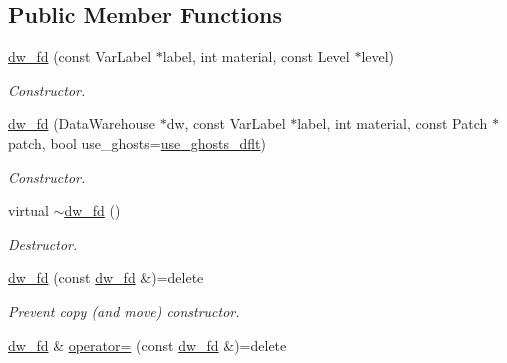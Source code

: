 \subsection*{Public Member Functions}
\begin{DoxyCompactItemize}
\item 
\hyperlink{classUintah_1_1PhaseField_1_1detail_1_1dw__fd_3_01ScalarField_3_01T_01_4_00_01STN_00_01VAR_00_011_01_4_a27f38724446925a1a5fc4674295e86c7}{dw\+\_\+fd} (const Var\+Label $\ast$label, int material, const Level $\ast$level)
\begin{DoxyCompactList}\small\item\em Constructor. \end{DoxyCompactList}\item 
\hyperlink{classUintah_1_1PhaseField_1_1detail_1_1dw__fd_3_01ScalarField_3_01T_01_4_00_01STN_00_01VAR_00_011_01_4_a79108ca4987183e07f352f843c36451d}{dw\+\_\+fd} (Data\+Warehouse $\ast$dw, const Var\+Label $\ast$label, int material, const Patch $\ast$patch, bool use\+\_\+ghosts=\hyperlink{classUintah_1_1PhaseField_1_1detail_1_1dw__fd_3_01ScalarField_3_01T_01_4_00_01STN_00_01VAR_00_011_01_4_a052f491aac43151f67e123d0bf79ea96}{use\+\_\+ghosts\+\_\+dflt})
\begin{DoxyCompactList}\small\item\em Constructor. \end{DoxyCompactList}\item 
virtual \hyperlink{classUintah_1_1PhaseField_1_1detail_1_1dw__fd_3_01ScalarField_3_01T_01_4_00_01STN_00_01VAR_00_011_01_4_a2ca1bbfb2df0c09ef52e269c6283f28d}{$\sim$dw\+\_\+fd} ()
\begin{DoxyCompactList}\small\item\em Destructor. \end{DoxyCompactList}\item 
\hyperlink{classUintah_1_1PhaseField_1_1detail_1_1dw__fd_3_01ScalarField_3_01T_01_4_00_01STN_00_01VAR_00_011_01_4_ad0b66fa4134e4de6b7e0ad9258d42f0d}{dw\+\_\+fd} (const \hyperlink{classUintah_1_1PhaseField_1_1detail_1_1dw__fd}{dw\+\_\+fd} \&)=delete
\begin{DoxyCompactList}\small\item\em Prevent copy (and move) constructor. \end{DoxyCompactList}\item 
\hyperlink{classUintah_1_1PhaseField_1_1detail_1_1dw__fd}{dw\+\_\+fd} \& \hyperlink{classUintah_1_1PhaseField_1_1detail_1_1dw__fd_3_01ScalarField_3_01T_01_4_00_01STN_00_01VAR_00_011_01_4_ad55ec5600ad65557c49858f75f0392db}{operator=} (const \hyperlink{classUintah_1_1PhaseField_1_1detail_1_1dw__fd}{dw\+\_\+fd} \&)=delete

\end{DoxyCompactItemize}

